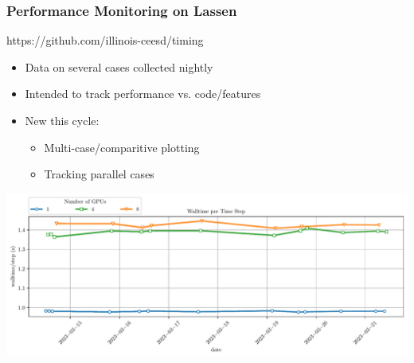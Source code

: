 \begin{frame}\frametitle{Performance Monitoring on Lassen}
\begin{center}
https://github.com/illinois-ceesd/timing
\end{center}
\begin{multicols}{2}
\begin{itemize}
\item Data on several cases collected nightly
\item Intended to track performance vs. code/features
\item New this cycle:
\begin{itemize}
\item Multi-case/comparitive plotting
\item Tracking parallel cases
\end{itemize}
\end{itemize}
\end{multicols}
\includegraphics[width=\textwidth]{figures/prediction-scaling-tracking.pdf}
\end{frame}

